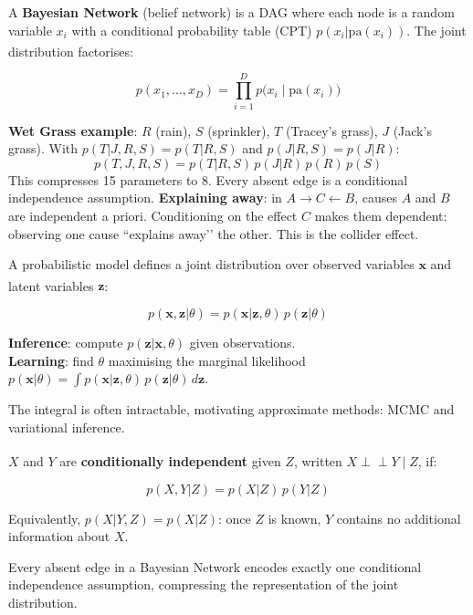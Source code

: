 \begin{tcbitemize}[ skin=sectionraster ]
    \tcbitem[title=Bayesian Networks, raster multicolumn=6]
    A \textbf{Bayesian Network} (belief network) is a DAG where each node is
    a random variable $x_i$ with a conditional probability table (CPT)
    $p(x_i | \mathrm{pa}(x_i))$. The joint distribution
    factorises:\textsuperscript{\cite[][pp.~33--40]{barberBayesianReasoningMachine2012}}

    \begin{equation}
        p(x_1, \ldots, x_D) = \prod_{i=1}^{D} p\bigl(x_i \mid \mathrm{pa}(x_i)\bigr)
    \end{equation}

    \textbf{Wet Grass example}: $R$ (rain), $S$ (sprinkler), $T$ (Tracey’s
    grass), $J$ (Jack’s grass). With $p(T|J,R,S)=p(T|R,S)$ and $p(J|R,S)=p(J|R)$:
    \[p(T,J,R,S) = p(T|R,S)\,p(J|R)\,p(R)\,p(S)\]
    This compresses 15 parameters to 8. Every absent edge is a conditional
    independence assumption.
    \tcblower
    \textbf{Explaining away}: in $A \to C \leftarrow B$, causes $A$ and $B$
    are independent a priori. Conditioning on the effect $C$ makes them
    dependent: observing one cause ``explains away’’ the other.
    This is the collider effect.

    \tcbitem[title=Probabilistic Modelling, raster multicolumn=3]
    A probabilistic model defines a joint distribution over observed variables
    $\mathbf{x}$ and latent variables
    $\mathbf{z}$:\textsuperscript{\cite[][Ch.~1]{barberBayesianReasoningMachine2012}}

    \begin{equation}
        p(\mathbf{x}, \mathbf{z} | \theta) =
            p(\mathbf{x} | \mathbf{z}, \theta)\,p(\mathbf{z}|\theta)
    \end{equation}

    \textbf{Inference}: compute $p(\mathbf{z}|\mathbf{x},\theta)$ given observations.\\
    \textbf{Learning}: find $\theta$ maximising the marginal likelihood
    $p(\mathbf{x}|\theta) = \int p(\mathbf{x}|\mathbf{z},\theta)\,p(\mathbf{z}|\theta)\,d\mathbf{z}$.

    The integral is often intractable, motivating approximate methods:
    MCMC and variational inference.

    \tcbitem[title=Conditional Independence, raster multicolumn=3]
    $X$ and $Y$ are \textbf{conditionally independent} given $Z$, written
    $X \perp\!\!\!\perp Y \mid Z$,
    if:\textsuperscript{\cite[][p.~8]{barberBayesianReasoningMachine2012}}

    \begin{equation}
        p(X, Y | Z) = p(X|Z)\,p(Y|Z)
    \end{equation}

    Equivalently, $p(X|Y,Z) = p(X|Z)$: once $Z$ is known, $Y$ contains no
    additional information about $X$.

    Every absent edge in a Bayesian Network encodes exactly one conditional
    independence assumption, compressing the representation of the joint
    distribution.

    \end{tcbitemize}

